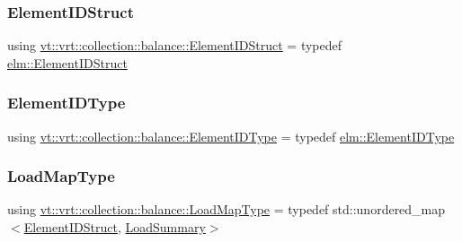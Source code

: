 \mbox{\label{namespacevt_1_1vrt_1_1collection_1_1balance_a9f5b53fafb270212279a4757d2c4cd28}} 
\subsubsection{\texorpdfstring{Element\+I\+D\+Struct}{ElementIDStruct}}
{\footnotesize\ttfamily using \hyperlink{namespacevt_1_1vrt_1_1collection_1_1balance_a9f5b53fafb270212279a4757d2c4cd28}{vt\+::vrt\+::collection\+::balance\+::\+Element\+I\+D\+Struct} = typedef \hyperlink{structvt_1_1elm_1_1_element_i_d_struct}{elm\+::\+Element\+I\+D\+Struct}}

\mbox{\label{namespacevt_1_1vrt_1_1collection_1_1balance_a592736f733df4f90856df90a1fd08905}} 
\subsubsection{\texorpdfstring{Element\+I\+D\+Type}{ElementIDType}}
{\footnotesize\ttfamily using \hyperlink{namespacevt_1_1vrt_1_1collection_1_1balance_a592736f733df4f90856df90a1fd08905}{vt\+::vrt\+::collection\+::balance\+::\+Element\+I\+D\+Type} = typedef \hyperlink{namespacevt_1_1elm_a63afb64985b41b7b6dcf2f01336391f8}{elm\+::\+Element\+I\+D\+Type}}

\mbox{\label{namespacevt_1_1vrt_1_1collection_1_1balance_a5339303db2e1ce964d783a53fd74e6b1}} 
\subsubsection{\texorpdfstring{Load\+Map\+Type}{LoadMapType}}
{\footnotesize\ttfamily using \hyperlink{namespacevt_1_1vrt_1_1collection_1_1balance_a5339303db2e1ce964d783a53fd74e6b1}{vt\+::vrt\+::collection\+::balance\+::\+Load\+Map\+Type} = typedef std\+::unordered\+\_\+map$<$\hyperlink{namespacevt_1_1vrt_1_1collection_1_1balance_a9f5b53fafb270212279a4757d2c4cd28}{Element\+I\+D\+Struct}, \hyperlink{structvt_1_1vrt_1_1collection_1_1balance_1_1_load_summary}{Load\+Summary}$>$}

